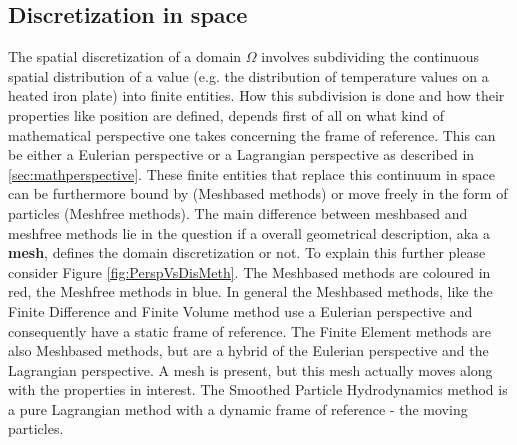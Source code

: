 \subsection{Discretization in space}
The spatial discretization of a domain $ \Omega $ involves subdividing the continuous spatial distribution of a value (e.g. the distribution of temperature values on a heated iron plate) into finite entities. How this subdivision is done and how their properties like position are defined, depends first of all on what kind of
mathematical perspective one takes concerning the frame of reference. This can be either a Eulerian perspective or a Lagrangian perspective as described in \ref{sec:mathperspective}. These finite entities that replace this continuum in space can be furthermore bound by  (Meshbased methods) or move freely in the form of particles (Meshfree methods). The main difference between meshbased and meshfree methods lie in the question if a overall geometrical description, aka a \textbf{mesh}, defines the domain discretization or not.
To explain this further please consider Figure \ref{fig:PerspVsDisMeth}. The Meshbased methods are coloured in red, the Meshfree methods in blue. In general the Meshbased methods, like the Finite Difference and Finite Volume method use a Eulerian perspective and consequently have a static frame of reference. The Finite Element methods are also Meshbased methods, but are a hybrid of the Eulerian perspective and the Lagrangian perspective. A mesh is present, but this mesh actually moves along with the properties in interest. The Smoothed Particle Hydrodynamics method is a pure Lagrangian method with a dynamic frame of reference - the moving particles. 


